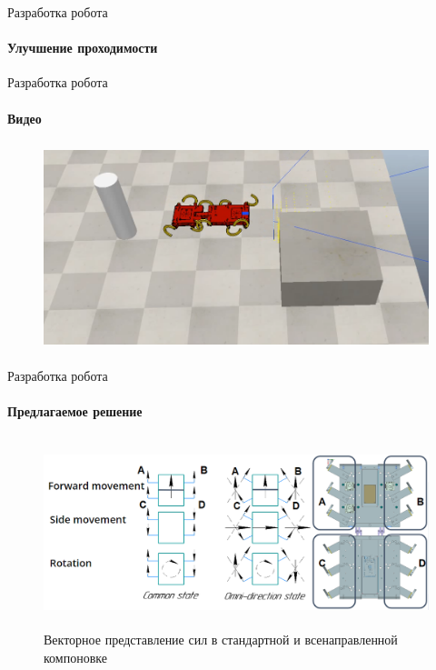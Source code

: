 \documentclass[aspectratio=169,xcolor=table]{beamer}
\begin{document}
\begin{frame}[t]{Разработка робота}
    \framesubtitle{Улучшение проходимости}
\end{frame}

\begin{frame}[t]{Разработка робота}
    \framesubtitle{Видео}
    \vspace{-0.6cm}
    \begin{figure}[H]
        \href{https://youtu.be/EQ6oGZVDpoc}{
            \centering\includegraphics[height=6cm,width=1\textwidth,keepaspectratio]{sidestep_segment_video_preview.png}}
    \end{figure}
\end{frame}

\begin{frame}[t]{Разработка робота}
    \framesubtitle{Предлагаемое решение}
    \vspace{-0.8cm}
    \begin{figure}[H]
        \centering\includegraphics[height=5.5cm,width=1\textwidth,keepaspectratio]{omni_rot.png}
        \caption*{Векторное представление сил в стандартной и всенаправленной компоновке}
    \end{figure}
\end{frame}
\end{document}
